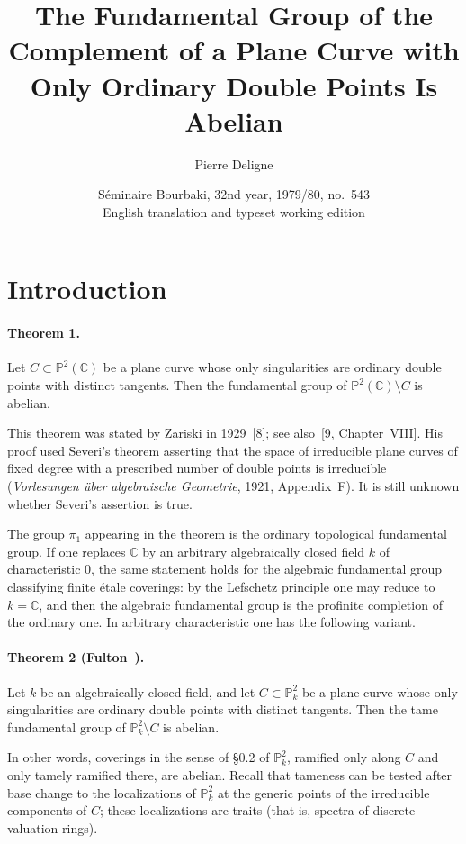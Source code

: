 \documentclass[11pt]{amsart}
\title[Plane curve complement]{The Fundamental Group of the Complement of a Plane Curve with Only Ordinary Double Points Is Abelian}
\author{Pierre Deligne}
\date{S\'eminaire Bourbaki, 32nd year, 1979/80, no.~543\\English translation and typeset working edition}
\newcommand{\PP}{\mathbb{P}}
\newcommand{\CC}{\mathbb{C}}
\begin{document}
\maketitle

\section*{Introduction}

\paragraph{\textbf{Theorem 1.}}
Let $C \subset \PP^2(\CC)$ be a plane curve whose only singularities are ordinary double points with distinct tangents. Then the fundamental group of $\PP^2(\CC)\setminus C$ is abelian.

This theorem was stated by Zariski in 1929~[8]; see also~[9, Chapter~VIII]. His proof used Severi's theorem asserting that the space of irreducible plane curves of fixed degree with a prescribed number of double points is irreducible (\emph{Vorlesungen \"uber algebraische Geometrie}, 1921, Appendix~F). It is still unknown whether Severi's assertion is true.

The group $\pi_1$ appearing in the theorem is the ordinary topological fundamental group. If one replaces $\CC$ by an arbitrary algebraically closed field $k$ of characteristic $0$, the same statement holds for the algebraic fundamental group classifying finite \'etale coverings: by the Lefschetz principle one may reduce to $k=\CC$, and then the algebraic fundamental group is the profinite completion of the ordinary one. In arbitrary characteristic one has the following variant.

\paragraph{\textbf{Theorem 2 (Fulton~\cite{Fulton1980}).}}
Let $k$ be an algebraically closed field, and let $C\subset \PP^2_k$ be a plane curve whose only singularities are ordinary double points with distinct tangents. Then the tame fundamental group of $\PP^2_k\setminus C$ is abelian.

In other words, coverings in the sense of \S0.2 of $\PP^2_k$, ramified only along $C$ and only tamely ramified there, are abelian. Recall that tameness can be tested after base change to the localizations of $\PP^2_k$ at the generic points of the irreducible components of $C$; these localizations are traits (that is, spectra of discrete valuation rings).
\end{document}
